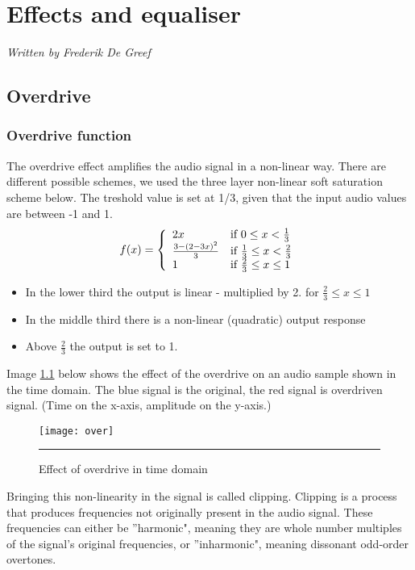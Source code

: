 \chapter{Effects and equaliser} %
\label{Chapter4} %
\textsl{Written by Frederik De Greef}
\section{Overdrive}
\subsection{Overdrive function}
The overdrive effect amplifies the audio signal in a non-linear way. There are different possible schemes, we used the three layer non-linear soft saturation scheme below. The treshold value is set at 1/3, given that the input audio values are between -1 and 1. 
\[ f(x) = \left\{
\begin{array}{ll}
2x & \mbox{if $0 \leq x < \frac{1}{3}$}\\
\frac{3-(2-3x)^{2}}{3} & \mbox{if $ \frac{1}{3} \leq x < \frac{2}{3}$}\\
1 & \mbox{if $ \frac{2}{3} \leq x \leq 1$}
\end{array} \right. \]
\begin{itemize}
\item In the lower third the output is linear - multiplied by 2. for $\frac{2}{3} \leq x \leq 1$
\item In the middle third there is a non-linear (quadratic) output response
\item Above $\frac{2}{3}$ the output is set to 1. 
\end{itemize}
Image \ref{fig:over} below shows the effect of the overdrive on an audio sample shown in the time domain. The blue signal is the original, the red signal is overdriven signal. (Time on the x-axis, amplitude on the y-axis.)
\begin{figure}[htbp]
\centering
\texttt{[image: over]}
\rule{30em}{0.5pt}
\caption{Effect of overdrive in time domain}
\label{fig:over}
\end{figure}
Bringing this non-linearity in the signal is called clipping. Clipping is a process that produces frequencies not originally present in the audio signal. 
These frequencies can either be ''harmonic", meaning they are whole number multiples of the signal's original frequencies, or ''inharmonic", meaning dissonant odd-order overtones. \\

